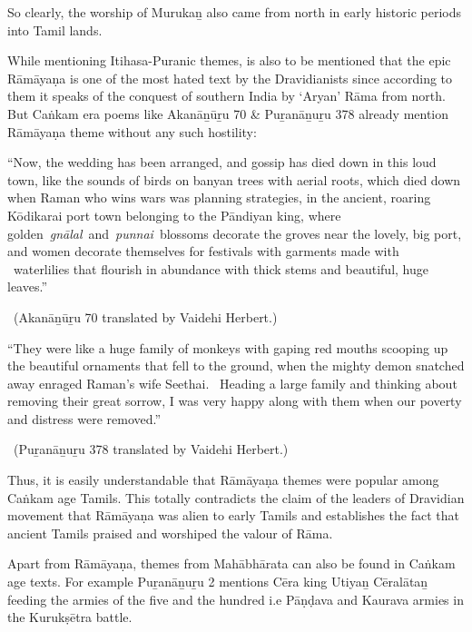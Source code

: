 So clearly, the worship of Murukaṉ also came from north in early historic periods into Tamil lands.

While mentioning Itihasa-Puranic themes, is also to be mentioned that the epic Rāmāyaṇa is one of the most hated text by the Dravidianists since according to them it speaks of the conquest of southern India by ‘Aryan’ Rāma from north. But Caṅkam era poems like Akanāṉūṟu 70 \& Puṟanāṉuṟu 378 already mention Rāmāyaṇa theme without any such hostility:

\begin{myquote}
“Now, the wedding has been arranged, and gossip has died down in this loud town, like the sounds of birds on banyan trees with aerial roots, which died down when Raman who wins wars was planning strategies, in the ancient, roaring Kōdikarai port town belonging to the Pāndiyan king, where golden \textit{gnālal} and \textit{punnai} blossoms decorate the groves near the lovely, big port, and women decorate themselves for festivals with garments made with  waterlilies that flourish in abundance with thick stems and beautiful, huge leaves.”

~\hfill (Akanāṉūṟu 70 translated by Vaidehi Herbert.)
\end{myquote}

\begin{myquote}
“They were like a huge family of monkeys with gaping red mouths scooping up the beautiful ornaments that fell to the ground, when the mighty demon snatched away enraged Raman’s wife Seethai.  Heading a large family and thinking about removing their great sorrow, I was very happy along with them when our poverty and distress were removed.”

~\hfill (Puṟanāṉuṟu 378 translated by Vaidehi Herbert.)
\end{myquote}

Thus, it is easily understandable that Rāmāyaṇa themes were popular among Caṅkam age Tamils. This totally contradicts the claim of the leaders of Dravidian movement that Rāmāyaṇa was alien to early Tamils and establishes the fact that ancient Tamils praised and worshiped the valour of Rāma.

Apart from Rāmāyaṇa, themes from Mahābhārata can also be found in Caṅkam age texts. For example Puṟanāṉuṟu 2 mentions Cēra king Utiyaṉ Cēralātaṉ feeding the armies of the five and the hundred i.e Pāṇḍava and Kaurava armies in the Kurukṣētra battle.

